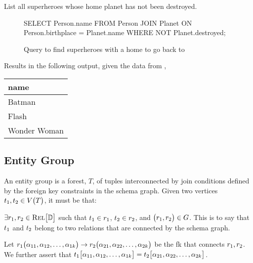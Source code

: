 		\begin{ex}
			List all superheroes whose home planet has not been destroyed.
			
			\begin{figure}[!ht]
				\begin{singlespaced}
					\begin{sqlcode}
SELECT Person.name
FROM   Person
       JOIN Planet
         ON Person.birthplace = Planet.name
WHERE  NOT Planet.destroyed;
					\end{sqlcode}
				\end{singlespaced}
				
				\caption{Query to find superheroes with a home to go back to}
			\end{figure}
			
			Results in the following output, given the data from ,
			
			\begin{table}[!ht]
				\centering
				
				\begin{tabular}{l}
					\toprule
					name \\
					\midrule
					Batman \\
					Flash \\
					Wonder Woman \\
					\bottomrule
				\end{tabular}
			\end{table}
		\end{ex}
		
	\subsection{Entity Group}
		\begin{defn}
		\label{def:entity-group}
			An entity group is a forest, $T$,  of tuples interconnected by join conditions defined by the foreign key constraints in the schema graph.  Given two vertices $t_1, t_2 \in V\bigl(T\bigr)$, it must be that:

			$\exists r_1, r_2 \in \textsc{Rel}\bigl[\mathbb{D}\bigr]$ such that $t_1 \in r_1$, $t_2\in r_2$, and $\bigl(r_1, r_2\bigr)\in G$.  This is to say that $t_1$ and $t_2$ belong to two relations that are connected by the schema graph.

			Let $r_1\bigl(\alpha_{11}, \alpha_{12}, \dotsc, \alpha_{1k}\bigr) \to r_2\bigl(\alpha_{21}, \alpha_{22}, \dotsc, \alpha_{2k}\bigr)$ be the \gls{fk} that connects $r_1, r_2$.  We further assert that $t_1\bigl[\alpha_{11}, \alpha_{12}, \dotsc, \alpha_{1k}\bigr] = t_2\bigl[\alpha_{21}, \alpha_{22}, \dotsc, \alpha_{2k}\bigr]$.
		\end{defn}
		
